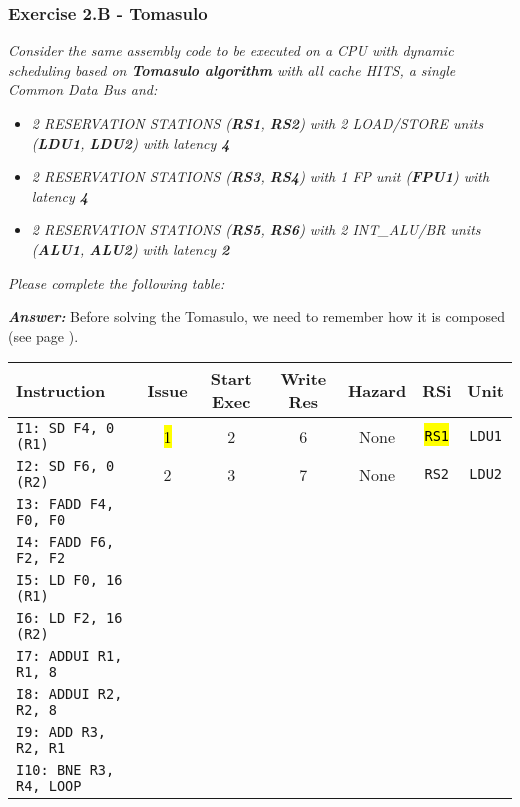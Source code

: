 \subsubsection*{Exercise 2.B - Tomasulo}

\emph{Consider the same assembly code to be executed on a CPU with dynamic scheduling based on \textbf{Tomasulo algorithm} with all cache HITS, a single Common Data Bus and:}
\begin{itemize}
    \item \emph{2 RESERVATION STATIONS (\textbf{RS1}, \textbf{RS2}) with 2 LOAD/STORE units (\textbf{LDU1}, \textbf{LDU2}) with latency \textbf{4}}
    \item \emph{2 RESERVATION STATIONS (\textbf{RS3}, \textbf{RS4}) with 1 FP unit (\textbf{FPU1}) with latency \textbf{4}}
    \item \emph{2 RESERVATION STATIONS (\textbf{RS5}, \textbf{RS6}) with 2 INT\_ALU/BR units (\textbf{ALU1}, \textbf{ALU2}) with latency \textbf{2}}
\end{itemize}
\emph{Please complete the following table:}

\highspace
\textcolor{Green3}{\textbf{\emph{Answer:}}} Before solving the Tomasulo, we need to remember how it is composed (see page \pageref{fig: tomasulo fpu}).

\begin{table}[!htp]
    \centering
    \begin{adjustbox}{width={\textwidth},totalheight={\textheight},keepaspectratio}
    \begin{tabular}{@{} l c c c c c c @{}}
        \toprule
        \textbf{Instruction} & \textbf{Issue} & \textbf{Start Exec} & \textbf{Write Res} & \textbf{Hazard} & \textbf{RSi} & \textbf{Unit} \\
        \midrule
        \texttt{I1: SD F4, 0 (R1)}      & \hl{1} & 2 & 6 & None  & \hl{\texttt{RS1}}   & \texttt{LDU1}  \\ [.5em]
        \texttt{I2: SD F6, 0 (R2)}      & 2 & 3 & 7 & None  & \texttt{RS2}   & \texttt{LDU2}  \\ [.5em]
        \texttt{I3: FADD F4, F0, F0}    &   &   &   &       &       &       \\ [.5em]
        \texttt{I4: FADD F6, F2, F2}    &   &   &   &       &       &       \\ [.5em]
        \texttt{I5: LD F0, 16 (R1)}     &   &   &   &       &       &       \\ [.5em]
        \texttt{I6: LD F2, 16 (R2)}     &   &   &   &       &       &       \\ [.5em]
        \texttt{I7: ADDUI R1, R1, 8}    &   &   &   &       &       &       \\ [.5em]
        \texttt{I8: ADDUI R2, R2, 8}    &   &   &   &       &       &       \\ [.5em]
        \texttt{I9: ADD R3, R2, R1}     &   &   &   &       &       &       \\ [.5em]
        \texttt{I10: BNE R3, R4, LOOP}   &   &   &   &       &       &       \\
        \bottomrule
    \end{tabular}
    \end{adjustbox}
\end{table}

